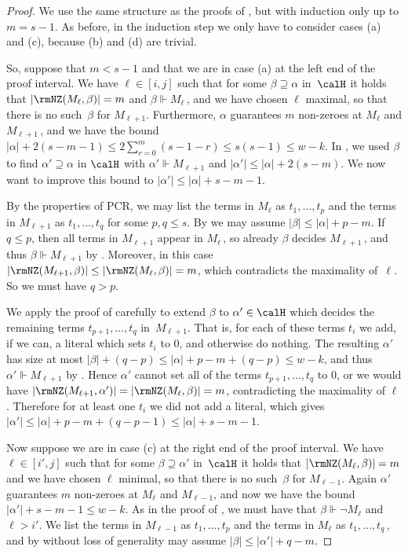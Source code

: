 \documentclass{toc}
\begin{document}
\begin{proof}
We use the same structure as the proofs of 
,  %
but with induction only up to $m=s-1$. As before, in the induction step we only have to consider
cases (a) and (c), because (b) and (d) are trivial.

So, suppose that $m<s-1$ and that we are in case (a) at the left end 
of the proof interval. We have  $\ell \in [i,j]$ such that for some $\beta \supseteq \alpha$ in~$\calH$
it holds that $|\rmNZ(M_\ell, \beta)| = m$ and $\beta \Vdash M_\ell$\,,
and we have chosen $\ell$ maximal, so that there is no such~$\beta$ for $M_{\ell+1}$. 
Furthermore, $\alpha$ guarantees $m$ non-zeroes at $M_\ell$ and $M_{\ell+1}$\,, and
we have the bound
$|\alpha| + 2(s-m-1) \le 2 \sum_{r=0}^{m} (s-1-r) \le s(s-1) \le w - k$.
In , we used $\beta$ to find $\alpha' \supseteq \alpha$ in $\calH$
with $\alpha' \Vdash M_{\ell+1}$ and $|\alpha'| \le |\alpha|+2(s-m)$. 
We now want  to improve this bound to $|\alpha'| \le |\alpha|+s-m-1$.

By the properties of PCR, we may list the terms in $M_\ell$ as $t_1, \dots, t_p$
and the terms in $M_{\ell+1}$ as $t_1, \dots, t_q$ for some $p,q \le s$.
By  we may assume $|\beta| \le |\alpha|+p-m$.
If $q \le p$, then all terms in $M_{\ell+1}$ appear in $M_\ell$\,,
so already $\beta$ decides $M_{\ell+1}$\,, and thus 
$\beta \Vdash M_{\ell+1}$ by .
Moreover, in this case $|\rmNZ(M_{\ell+1}, \beta)| \le |\rmNZ(M_\ell, \beta)| = m$, 
which contradicts the maximality of~$\ell$. So we must have $q>p$.


We  apply the proof of   carefully
to extend $\beta$ to $\alpha' \in \calH$ which
decides the remaining terms $t_{p+1}, \dots, t_q$ in~$M_{\ell+1}$.
That is, for each of these terms $t_i$ we add, if we can, a literal which sets $t_i$ to $0$, and otherwise do nothing.
The resulting $\alpha'$
has size at most $|\beta| + (q-p) \le |\alpha|+ p-m + (q-p) \le w-k$, and thus $\alpha' \Vdash M_{\ell+1}$
by . Hence $\alpha'$
cannot set all of the terms $t_{p+1}, \dots, t_q$ to $0$, 
or we would have $|\rmNZ(M_{\ell+1}, \alpha')| = |\rmNZ(M_\ell, \beta)|=m$, 
contradicting the maximality of $\ell$.
Therefore for at least one $t_i$ we did not add a literal,
which gives $|\alpha'| \le |\alpha|+p-m + (q-p-1) \le |\alpha|+ s-m-1$.

Now suppose we are in case (c) at the right end of the proof interval.
We have  $\ell \in [i',j]$ such that for some $\beta \supseteq \alpha'$ in~$\calH$
it holds that $|\rmNZ(M_{\ell}, \beta)| = m$ 
and we have chosen $\ell$ minimal, so that there is no such~$\beta$ for $M_{\ell-1}$. 
Again $\alpha'$ guarantees $m$ non-zeroes at $M_\ell$ and $M_{\ell-1}$, and now
we have the bound
$|\alpha'| + s-m-1 \le w - k$.
As in the proof of , we must have 
that $\beta \Vdash \neg M_{\ell}$ and $\ell > i'$.
We list the terms in $M_{\ell-1}$ as $t_1, \dots, t_p$
and the terms in $M_{\ell}$ as $t_1, \dots, t_q$\,,
and by  without loss of generality may assume 
$|\beta| \le |\alpha'|+q-m$.


\end{proof}
\end{document}
